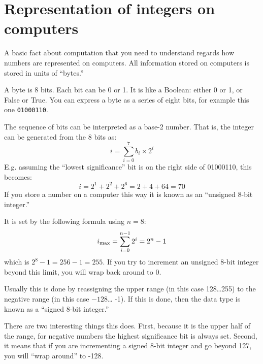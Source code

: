 \section{Representation of integers on computers}

A basic fact about computation that you need to understand regards how
numbers are represented on computers. All information stored on
computers is stored in units of ``bytes.''


\begin{answer}
  A byte is 8 bits. Each bit can be 0 or 1. It is like a Boolean:
  either 0 or 1, or False or True. You can express a byte as a series
  of eight bits, for example this one {\tt 01000110}.
\end{answer}


\begin{answer}
  The sequence of bits can be interpreted as a base-2 number. That is,
  the integer can be generated from the 8 bits as:
\begin{equation}
i = \sum_{i=0}^7 b_i \times 2^i
\end{equation}
E.g. assuming the ``lowest significance'' bit is on the right side of
01000110, this becomes:
\begin{equation}
i = 2^1 + 2^2 + 2^6 = 2 + 4 + 64 = 70
\end{equation}
If you store a number on a computer this way it is known as an
``unsigned 8-bit integer.''
\end{answer}


\begin{answer}
  It is set by the following formula using $n=8$:
  \begin{equation}
    i_{\rm max} = \sum_{i=0}^{n-1} 2^i = 2^n - 1
  \end{equation}
  which is $2^8 - 1 = 256 - 1 = 255$. If you try to increment an
  unsigned 8-bit integer beyond this limit, you will wrap back around to
  0.
\end{answer}


\begin{answer}
  Usually this is done by reassigning the upper range (in this
  case 128\ldots 255) to the negative range (in this case $-128$\ldots
  -1). If this is done, then the data type is known as a ``signed
  8-bit integer.''

  There are two interesting things this does. First, because it is the
  upper half of the range, for negative numbers the highest
  significance bit is always set. Second, it means that if you are
  incrementing a signed 8-bit integer and go beyond 127, you will
  ``wrap around'' to -128.
\end{answer}

